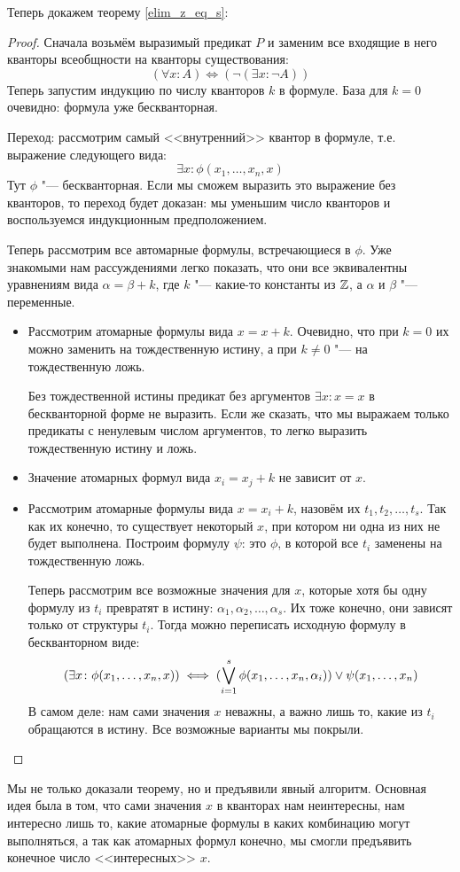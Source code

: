 Теперь докажем теорему \ref{elim_z_eq_s}:
\begin{proof}
	Сначала возьмём выразимый предикат $P$ и заменим все входящие в него кванторы всеобщности на кванторы существования:
	\[ (\forall x \colon A) \iff (\lnot(\exists x \colon \lnot A)) \]
	Теперь запустим индукцию по числу кванторов $k$ в формуле.
	База для $k=0$ очевидно: формула уже бескванторная.

	Переход: рассмотрим самый <<внутренний>> квантор в формуле, т.е. выражение следующего вида:
	\[ \exists x \colon \phi(x_1, \dots, x_n, x) \]
	Тут $\phi$ "--- бескванторная.
	Если мы сможем выразить это выражение без кванторов, то переход будет доказан: мы уменьшим число кванторов и воспользуемся индукционным предположением.

	Теперь рассмотрим все автомарные формулы, встречающиеся в $\phi$.
	Уже знакомыми нам рассуждениями легко показать, что они все эквивалентны уравнениям вида $\alpha = \beta + k$, где $k$ "--- какие-то константы из $\mathbb{Z}$, а $\alpha$ и $\beta$ "--- переменные.
	\begin{itemize}
	\item
		Рассмотрим атомарные формулы вида $x = x + k$.
		Очевидно, что при $k=0$ их можно заменить на тождественную истину, а при $k \neq 0$ "--- на тождественную ложь.
		\begin{Rem}
			Без тождественной истины предикат без аргументов $\exists x \colon x=x$ в бескванторной форме не выразить.
			Если же сказать, что мы выражаем только предикаты с ненулевым числом аргументов, то легко выразить тождественную истину и ложь.
		\end{Rem}
	\item
		Значение атомарных формул вида $x_i = x_j + k$ не зависит от $x$.
	\item
		Рассмотрим атомарные формулы вида $x = x_i + k$, назовём их $t_1, t_2, \dots, t_s$.
		Так как их конечно, то существует некоторый $x$, при котором ни одна из них не будет выполнена.
		Построим формулу $\psi$: это $\phi$, в которой все $t_i$ заменены на тождественную ложь.

		Теперь рассмотрим все возможные значения для $x$, которые хотя бы одну формулу из $t_i$ превратят в истину: $\alpha_1, \alpha_2, \dots, \alpha_s$.
		Их тоже конечно, они зависят только от структуры $t_i$.
		Тогда можно переписать исходную формулу в бескванторном виде:
		\[ (\exists x \colon \phi(x_1, \dots, x_n, x)) \iff (\bigvee_{i=1}^s \phi(x_1, \dots, x_n, \alpha_i)) \lor \psi(x_1, \dots, x_n) \]
		В самом деле: нам сами значения $x$ неважны, а важно лишь то, какие из $t_i$ обращаются в истину.
		Все возможные варианты мы покрыли.
	\end{itemize}
\end{proof}
\begin{Rem}
	Мы не только доказали теорему, но и предъявили явный алгоритм.
	Основная идея была в том, что сами значения $x$ в кванторах нам неинтересны, нам интересно лишь то, какие
	атомарные формулы в каких комбинацию могут выполняться, а так как атомарных формул конечно, мы смогли предъявить конечное число <<интересных>> $x$.
\end{Rem}

